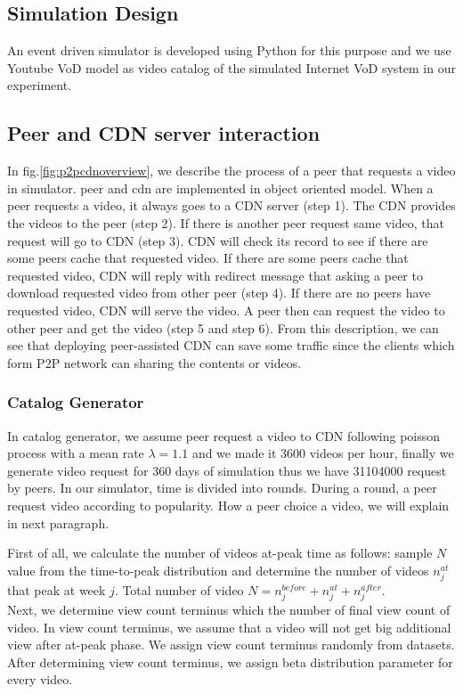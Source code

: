 \documentclass[conference]{IEEEtran}
\begin{document}
\subsection{Simulation Design}\label{simulationdesign}
An event driven simulator is developed using Python for this purpose and we use Youtube VoD model as video catalog of the simulated Internet VoD system in our experiment.

\subsection{Peer and CDN server interaction}
In fig.\ref{fig:p2pcdnoverview}, we describe the process of a peer that requests a video in simulator.
peer and cdn are implemented in object oriented model. 
When a peer requests a video, it always goes to a CDN server (step 1). 
The CDN provides the videos to the peer (step 2). 
If there is another peer request same video, that request will go to CDN (step 3).  
CDN will check its record to see if there are some peers cache that requested video.  
If there are some peers cache that requested video, CDN will reply with redirect message that asking a peer to download requested video from other peer (step 4).
If there are no peers have requested video, CDN will serve the video.   
A peer then can request the video to other peer and get the video (step 5 and step 6).
From this description, we can see that deploying peer-assisted CDN can save some traffic since the clients which form P2P network can sharing the contents or videos.


\subsubsection{Catalog Generator}
In catalog generator, we assume peer request a video to CDN following poisson process with a mean rate $\lambda=1.1$ \cite{Zink:2009:CYN:1502814.1502987} and we made it 3600 videos per hour, finally we generate video request for 360 days of simulation thus we have 31104000 request by peers. 
In our simulator, time is divided into rounds. 
During a round, a peer request video according to popularity. 
How a peer choice a video, we will explain in next paragraph.


First of all, we calculate the number of videos at-peak time as follows: sample $N$ value from the time-to-peak distribution and determine the number of videos $n_j^{at}$ that peak at week $j$. 
Total number of video $N = n_j^{before} + n_j^{at} + n_j^{after}$.\\
Next, we determine view count terminus which the number of final view count of video.
In view count terminus, we assume that a video will not get big additional view after at-peak phase.
We assign view count terminus randomly from datasets.
After determining view count terminus, we assign beta distribution parameter for every video. 
\end{document}
